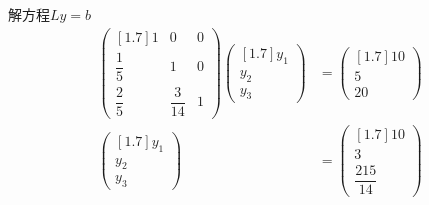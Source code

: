 \documentclass[11pt]{article}
\begin{document}
\begin{question}
{        解方程$Ly = b$
        \begin{align*}
            \begin{pmatrix}[1.7]
                1            & 0             & 0 \\
                \dfrac{1}{5} & 1             & 0 \\
                \dfrac{2}{5} & \dfrac{3}{14} & 1
            \end{pmatrix}
            \begin{pmatrix}[1.7]
                y_1 \\
                y_2 \\
                y_3
            \end{pmatrix}
             & =
            \begin{pmatrix}[1.7]
                10 \\
                5  \\
                20
            \end{pmatrix} \\
            \begin{pmatrix}[1.7]
                y_1 \\
                y_2 \\
                y_3
            \end{pmatrix}
             & =
            \begin{pmatrix}[1.7]
                10 \\
                3  \\
                \dfrac{215}{14}
            \end{pmatrix}
        \end{align*}

}
\end{question}
\end{document}

